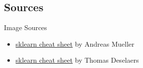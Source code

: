 \subsection*{Sources}
\begin{frame}{Image Sources}
    \begin{itemize}
        \item \href{http://peekaboo-vision.blogspot.de/2013/01/machine-learning-cheat-sheet-for-scikit.html}{sklearn cheat sheet} by  Andreas Mueller
        \item \href{http://groups.inf.ed.ac.uk/calvin/imagenet/prototypes.html}{sklearn cheat sheet} by Thomas Deselaers
    \end{itemize}
\end{frame}